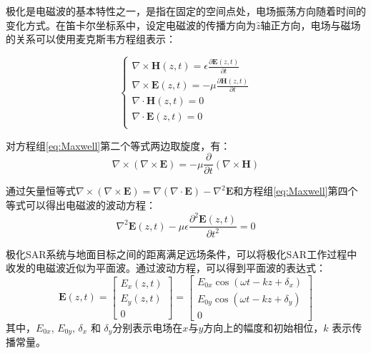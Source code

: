 极化是电磁波的基本特性之一，是指在固定的空间点处，电场振荡方向随着时间的变化方式。在笛卡尔坐标系中，设定电磁波的传播方向为$\hat{z}$轴正方向，电场与磁场的关系可以使用麦克斯韦方程组表示：

\begin{equation}
    \label{eq:Maxwell}
    \begin{cases}
        \nabla \times \boldsymbol{H}(z,t)=\epsilon \frac{\partial \boldsymbol{E}(z,t)}{\partial t} \\
        \nabla \times \boldsymbol{E}(z,t)=-\mu \frac{\partial \boldsymbol{H}(z,t)}{\partial t}     \\
        \nabla \cdot \boldsymbol{H}(z,t)=0                                                         \\
        \nabla \cdot \boldsymbol{E}(z,t)=0                                                         \\
    \end{cases}
\end{equation}

对方程组\eqref{eq:Maxwell}第二个等式两边取旋度，有：
\begin{equation}
    \nabla \times(\nabla \times \boldsymbol{E})=-\mu \frac{\partial}{\partial t}(\nabla \times \boldsymbol{H})
\end{equation}

通过矢量恒等式$\nabla \times(\nabla \times \boldsymbol{E})=\nabla(\nabla \cdot \boldsymbol{E})-\nabla^2 \boldsymbol{E}$和方程组\eqref{eq:Maxwell}第四个等式可以得出电磁波的波动方程：
\begin{equation}
    \nabla^2 \boldsymbol{E}(z, t)-\mu \epsilon \frac{\partial^2 \boldsymbol{E}(z, t)}{\partial t^2}=0
\end{equation}

极化SAR系统与地面目标之间的距离满足远场条件，可以将极化SAR工作过程中收发的电磁波近似为平面波。通过波动方程，可以得到平面波的表达式：
\begin{equation}
    \label{平面波}
    \boldsymbol{E}(z, t)=\left[\begin{array}{c}
            E_x(z, t) \\
            E_y(z, t) \\
            0
        \end{array}\right]=\left[\begin{array}{c}
            E_{0 x} \cos \left(\omega t-k z+\delta_x\right) \\
            E_{0 y} \cos \left(\omega t-k z+\delta_y\right) \\
            0
        \end{array}\right]
\end{equation}
其中，$E_{0x}$, $E_{0y}$, $\delta_x$ 和 $\delta_y$分别表示电场在$x$与$y$方向上的幅度和初始相位，$k$ 表示传播常量。

